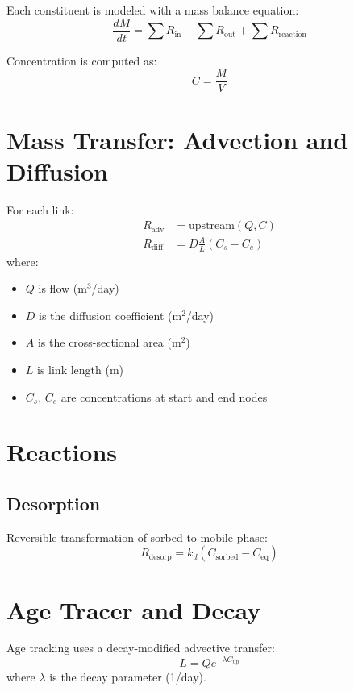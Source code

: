 \documentclass[12pt]{report}
\begin{document}
Each constituent is modeled with a mass balance equation:
\begin{equation}
\frac{dM}{dt} = \sum R_{\text{in}} - \sum R_{\text{out}} + \sum R_{\text{reaction}}
\end{equation}

Concentration is computed as:
\begin{equation}
C = \frac{M}{V}
\end{equation}

\section{Mass Transfer: Advection and Diffusion}

For each link:
\begin{align}
R_{\text{adv}} &= \text{upstream}(Q, C) \\
R_{\text{diff}} &= D \frac{A}{L}(C_s - C_e)
\end{align}
where:
\begin{itemize}
  \item $Q$ is flow (m$^3$/day)
  \item $D$ is the diffusion coefficient (m$^2$/day)
  \item $A$ is the cross-sectional area (m$^2$)
  \item $L$ is link length (m)
  \item $C_s$, $C_e$ are concentrations at start and end nodes
\end{itemize}

\section{Reactions}

\subsection*{Desorption}
Reversible transformation of sorbed to mobile phase:
\begin{equation}
R_{\text{desorp}} = k_d (C_{\text{sorbed}} - C_{\text{eq}})
\end{equation}

\section{Age Tracer and Decay}

Age tracking uses a decay-modified advective transfer:
\begin{equation}
L = Q e^{-\lambda C_{\text{up}}}
\end{equation}
where $\lambda$ is the decay parameter (1/day).
\end{document}
